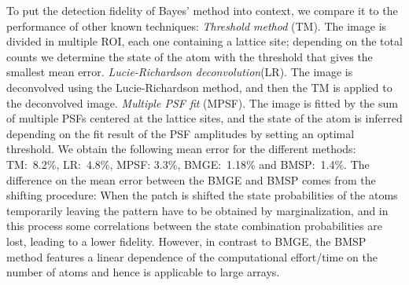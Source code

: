 \documentclass[aps,prl,twocolumn,english,showpacs]{revtex4-1}
\begin{document}
To put the detection fidelity of Bayes' method into context, we compare it to the performance of other known techniques: \textit{Threshold method} (TM). The image is divided in multiple ROI, each one containing a lattice site; depending on the total counts we determine the state of the atom with the threshold that gives the smallest mean error. \textit{Lucie-Richardson deconvolution}(LR). The image is deconvolved using the Lucie-Richardson method, and then the TM is applied to the deconvolved image. \textit{Multiple PSF fit} (MPSF). The image is fitted by the sum of multiple PSFs centered at the lattice sites, and the state of the atom is inferred depending on the fit result of the PSF amplitudes by setting an optimal threshold. We obtain the following mean error for the different methods: TM:~8.2\%, LR:~4.8\%, MPSF: 3.3\%, BMGE:~1.18\% and BMSP:~1.4\%.
The difference on the mean error between the BMGE and BMSP comes from the shifting procedure: When the patch is shifted the state probabilities of the atoms temporarily leaving the pattern have to be obtained by marginalization, and in this process some correlations between the state combination probabilities are lost, leading to a lower fidelity. However, in contrast to BMGE, the BMSP method features a linear dependence of the computational effort/time on the number of atoms and hence is applicable to large arrays.




\end{document}
